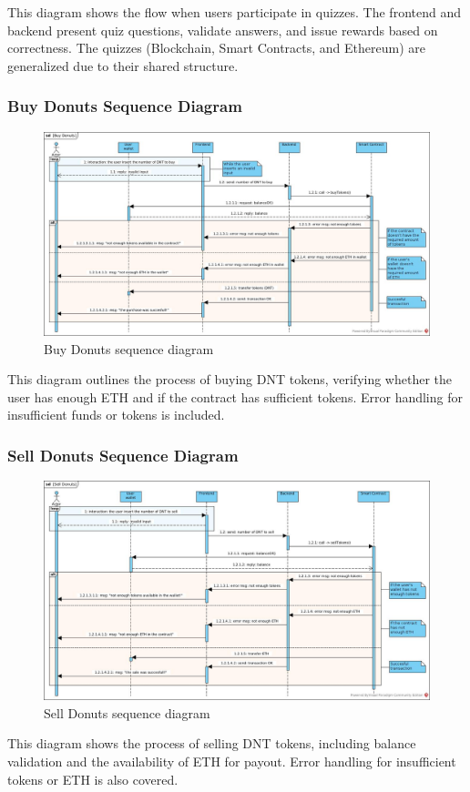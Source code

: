 \documentclass[../main.tex]{subfiles}
\begin{document}
This diagram shows the flow when users participate in quizzes. The frontend and backend present quiz questions, validate answers, and issue rewards based on correctness. The quizzes (Blockchain, Smart Contracts, and Ethereum) are generalized due to their shared structure.


\subsubsection{Buy Donuts Sequence Diagram}

\begin{figure}[H]
    \centering
    \includegraphics[width=\linewidth]{../src/diagrams/Buy Donuts.jpg}
    \caption{Buy Donuts sequence diagram}
    \label{fig:buyDNT_seqDiag}
\end{figure}

This diagram outlines the process of buying DNT tokens, verifying whether the user has enough ETH and if the contract has sufficient tokens. Error handling for insufficient funds or tokens is included.


\subsubsection{Sell Donuts Sequence Diagram}

\begin{figure}[H]
    \centering
    \includegraphics[width=\linewidth]{../src/diagrams/Sell Donuts.jpg}
    \caption{Sell Donuts sequence diagram}
    \label{fig:sellDNT_seqDiag}
\end{figure}

This diagram shows the process of selling DNT tokens, including balance validation and the availability of ETH for payout. Error handling for insufficient tokens or ETH is also covered.
\end{document}
